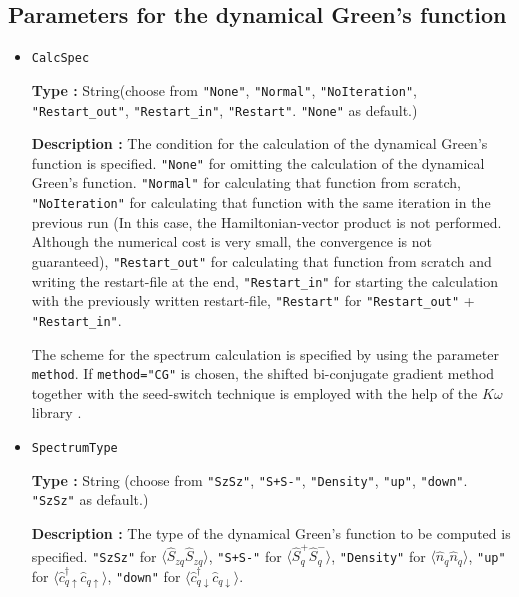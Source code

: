 \subsection{Parameters for the dynamical Green's function}

\begin{itemize}
\item \verb|CalcSpec|
  
  {\bf Type :} String(choose from \verb|"None"|, \verb|"Normal"|, \verb|"NoIteration"|,  
  \verb|"Restart_out"|, \verb|"Restart_in"|, \verb|"Restart"|. \verb|"None"| as default.)

  {\bf Description :} The condition for the calculation of the dynamical
  Green's function is specified.
  \verb|"None"| for omitting the calculation of the
  dynamical Green's function.
  \verb|"Normal"| for calculating that function from scratch,
  \verb|"NoIteration"| for calculating that function
  with the same iteration in the previous run
  (In this case, the Hamiltonian-vector product is not performed.
  Although the numerical cost is very small, the convergence is not guaranteed),
  \verb|"Restart_out"| for calculating that function from scratch
  and writing the restart-file at the end,
  \verb|"Restart_in"| for starting the calculation with the
  previously written restart-file,
  \verb|"Restart"| for \verb|"Restart_out"| + \verb|"Restart_in"|.

  The scheme for the spectrum calculation is specified
  by using the parameter \verb|method|.
  If \verb|method="CG"| is chosen, the shifted bi-conjugate gradient method
  \cite{Frommer2003}
  together with the seed-switch technique
  \cite{doi:10.1143/JPSJ.77.114713} is employed
  with the help of the $K\omega$ library \cite{komega}.
  
\item \verb|SpectrumType|
  
  {\bf Type :} String (choose from \verb|"SzSz"|, \verb|"S+S-"|, \verb|"Density"|,  
  \verb|"up"|, \verb|"down"|. \verb|"SzSz"| as default.)

  {\bf Description :} The type of the dynamical Green's function
  to be computed is specified.
  \verb|"SzSz"| for $\langle {\hat S}_{z q} {\hat S}_{z q}\rangle$,
  \verb|"S+S-"| for $\langle {\hat S}^{+}_{q} {\hat S}^{-}_{q}\rangle$,
  \verb|"Density"| for $\langle {\hat n}_{q} {\hat n}_{q}\rangle$,
  \verb|"up"| for $\langle {\hat c}^{\dagger}_{q \uparrow} {\hat c}_{q \uparrow}\rangle$,
  \verb|"down"| for $\langle {\hat c}^{\dagger}_{q \downarrow} {\hat c}_{q \downarrow}\rangle$.


\end{itemize}
